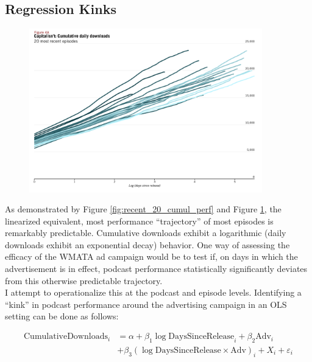 \documentclass[11pt, letterpaper, twoside]{article}
\begin{document}
\subsection{Regression Kinks}
\begin{figure}[!htb]
  \centering
  \includegraphics[width=0.9\textwidth]{figures/recent_20_episodes_linear_cumul_perf.png}
  \caption{}
  \label{fig:recent_20_linear_cumul_perf}
\end{figure}

As demonstrated by Figure \ref{fig:recent_20_cumul_perf} and Figure \ref{fig:recent_20_linear_cumul_perf}, the linearized equivalent, most performance ``trajectory'' of most episodes is remarkably predictable. Cumulative downloads exhibit a logarithmic (daily downloads exhibit an exponential decay) behavior. One way of assessing the efficacy of the WMATA ad campaign would be to test if, on days in which the advertisement is in effect, podcast performance statistically significantly deviates from this otherwise predictable trajectory.\\

I attempt to operationalize this at the podcast and episode levels. Identifying a ``kink'' in podcast performance around the advertising campaign in an OLS setting can be done as follows:

\begin{align}
  \label{kink-ols}
    \text{CumulativeDownloads}_i &= \alpha + \beta_1\log{\text{DaysSinceRelease}}_i + \beta_2\text{Adv}_i\\ \nonumber
      & +\beta_3(\log{\text{DaysSinceRelease}} \times \text{Adv})_i + X_i + \varepsilon_i
\end{align}
\end{document}

